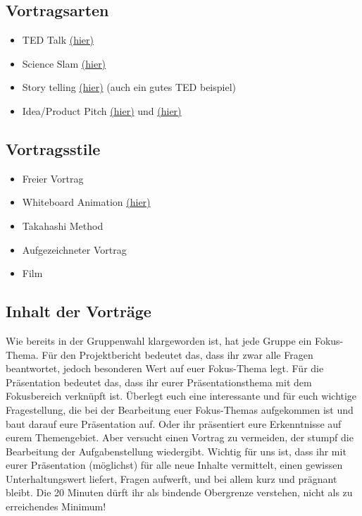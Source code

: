 \documentclass[DIV=15,headinclude=true]{scrartcl}
\begin{document}
\subsection{Vortragsarten}\label{vortragsarten}

\begin{itemize}
	\item
	      TED Talk
	      \href{https://www.ted.com/talks/chris_anderson_ted_s_secret_to_great_public_speaking}{(hier)}
	\item
	      Science Slam
	      \href{https://www.youtube.com/watch?v=GBVxDy2wx-g}{(hier)}
	\item
	      Story telling
	      \href{https://www.youtube.com/watch?v=D9Ihs241zeg}{(hier)} (auch ein
	      gutes TED beispiel)
	\item
	      Idea/Product Pitch
	      \href{https://www.youtube.com/watch?v=66tEqUX1XKo}{(hier)} und
	      \href{https://www.youtube.com/watch?v=vN4U5FqrOdQ}{(hier)}
\end{itemize}

\subsection{Vortragsstile}

\begin{itemize}
	\item
	      Freier Vortrag
	\item
	      Whiteboard Animation
	      \href{https://www.youtube.com/watch?v=i68a6M5FFBc}{(hier)}
	\item
	      Takahashi Method
	\item
	      Aufgezeichneter Vortrag
	\item
	      Film
\end{itemize}

\subsection{Inhalt der Vorträge}

Wie bereits in der Gruppenwahl klargeworden ist, hat jede Gruppe ein
Fokus-Thema. Für den Projektbericht bedeutet das, dass ihr zwar alle
Fragen beantwortet, jedoch besonderen Wert auf euer Fokus-Thema legt.
Für die Präsentation bedeutet das, dass ihr eurer Präsentationsthema mit
dem Fokusbereich verknüpft ist. Überlegt euch eine interessante und für
euch wichtige Fragestellung, die bei der Bearbeitung euer Fokus-Themas
aufgekommen ist und baut darauf eure Präsentation auf. Oder ihr
präsentiert eure Erkenntnisse auf eurem Themengebiet. Aber versucht
einen Vortrag zu vermeiden, der stumpf die Bearbeitung der
Aufgabenstellung wiedergibt. Wichtig für uns ist, dass ihr mit eurer
Präsentation (möglichst) für alle neue Inhalte vermittelt, einen
gewissen Unterhaltungswert liefert, Fragen aufwerft, und bei allem kurz
und prägnant bleibt. Die 20 Minuten dürft ihr als bindende Obergrenze
verstehen, nicht als zu erreichendes Minimum!
\end{document}
